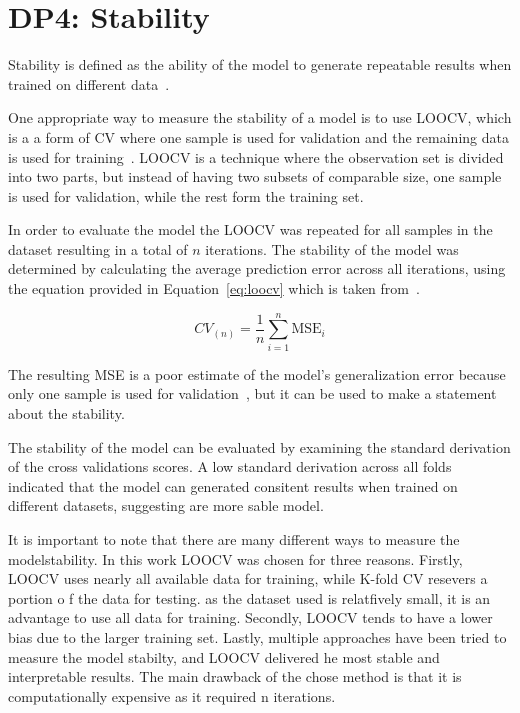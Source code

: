 \section{DP4: Stability}\label{sec:stability}
Stability is defined as the ability of the model to generate repeatable
results when trained on different data~\cite[p. 16]{siebert2022construction}.

One appropriate way to measure the stability of a model is to use \ac{LOOCV},
which is a a form of \ac{CV} where one sample is used for validation and the remaining
data is used for training~\cite[p. 200--201]{gareth2013introduction}.
LOOCV is a technique where the observation set is divided into two parts, but instead of having
two subsets of comparable size, one sample is used for validation, while the rest form the
training set.

In order to evaluate the model the \ac{LOOCV} was repeated for all samples in
the dataset resulting in a total of \(n\) iterations.
The stability of the model was determined by calculating the average prediction error across all
iterations, using the equation provided in Equation~\ref{eq:loocv} which is taken from~\cite[p.
201]{gareth2013introduction}.

\begin{tcolorbox}[arc=0pt,boxrule=0.5pt]
    \begin{equation}
        CV_{(n)} = \frac{1}{n} \sum_{i=1}^{n} \text{MSE}_{i}\label{eq:loocv}
    \end{equation}
\end{tcolorbox}

The resulting \ac{MSE} is a poor estimate of the model's generalization error because only one
sample is used for validation~\cite[p. 201]{gareth2013introduction}, but it can be used to make a
statement about the stability.

The stability of the model can be evaluated by examining the standard derivation of the cross
validations scores.
A low standard derivation across all folds indicated that the model can generated consitent
results when trained on different datasets, suggesting are more sable model.

It is important to note that there are many different ways to measure the modelstability.
In this work LOOCV was chosen for three reasons.
Firstly, \ac{LOOCV} uses nearly all available data for training, while K-fold CV resevers a
portion o f the data for testing.
as the dataset used is relatfively small, it is an advantage to use all data for training.
Secondly, \ac{LOOCV} tends to have a lower bias due to the larger training set.
Lastly, multiple approaches have been tried to measure the model stabilty, and LOOCV delivered
he most stable and interpretable results.
The main drawback of the chose method is that it is computationally expensive as it required n
iterations.

